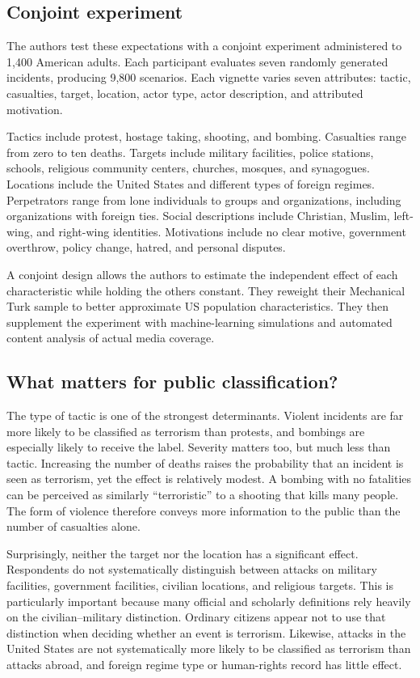 \subsection{Conjoint experiment}

The authors test these expectations with a conjoint experiment administered to 1,400 American adults. Each participant evaluates seven randomly generated incidents, producing 9,800 scenarios. Each vignette varies seven attributes: tactic, casualties, target, location, actor type, actor description, and attributed motivation.

Tactics include protest, hostage taking, shooting, and bombing. Casualties range from zero to ten deaths. Targets include military facilities, police stations, schools, religious community centers, churches, mosques, and synagogues. Locations include the United States and different types of foreign regimes. Perpetrators range from lone individuals to groups and organizations, including organizations with foreign ties. Social descriptions include Christian, Muslim, left-wing, and right-wing identities. Motivations include no clear motive, government overthrow, policy change, hatred, and personal disputes.

A conjoint design allows the authors to estimate the independent effect of each characteristic while holding the others constant. They reweight their Mechanical Turk sample to better approximate US population characteristics. They then supplement the experiment with machine-learning simulations and automated content analysis of actual media coverage.

\subsection{What matters for public classification?}

The type of tactic is one of the strongest determinants. Violent incidents are far more likely to be classified as terrorism than protests, and bombings are especially likely to receive the label. Severity matters too, but much less than tactic. Increasing the number of deaths raises the probability that an incident is seen as terrorism, yet the effect is relatively modest. A bombing with no fatalities can be perceived as similarly ``terroristic'' to a shooting that kills many people. The form of violence therefore conveys more information to the public than the number of casualties alone.

Surprisingly, neither the target nor the location has a significant effect. Respondents do not systematically distinguish between attacks on military facilities, government facilities, civilian locations, and religious targets. This is particularly important because many official and scholarly definitions rely heavily on the civilian--military distinction. Ordinary citizens appear not to use that distinction when deciding whether an event is terrorism. Likewise, attacks in the United States are not systematically more likely to be classified as terrorism than attacks abroad, and foreign regime type or human-rights record has little effect.

